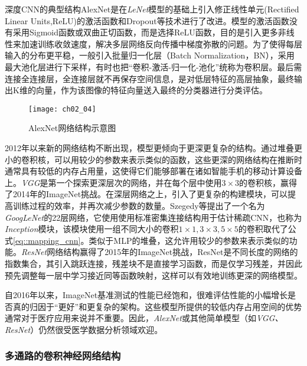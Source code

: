 深度CNN的典型结构AlexNet\cite{Krizhevsky2012}是在{\it LeNet}模型\citep{Jarrett2009}的基础上引入修正线性单元(Rectified Linear Units,ReLU)的激活函数和Dropout等技术\citep{Krizhevsky2012}进行了改进。模型的激活函数没有采用Sigmoid函数或双曲正切函数，而是选择ReLU函数，目的是引入更多非线性来加速训练收敛速度，解决多层网络反向传播中梯度弥散的问题。为了使得每层输入的分布更平稳，一般引入批量归一化层（Batch Normalization，BN）\cite{Ioffe2014Batch}，采用最大池化层进行下采样，有时也把“卷积-激活-归一化-池化”统称为卷积层。最后需连接全连接层，全连接层就不再保存空间信息，是对低层特征的高层抽象，最终输出K维的向量，作为该图像的特征向量送入最终的分类器进行分类评估。
\begin{figure}[!htbp]
    \centering
    \texttt{[image: ch02\_04]}
    \caption{AlexNet网络结构示意图~\cite{Krizhevsky2012}}
    \label{fig:ch02_04}
\end{figure}
 
2012年以来新的网络结构不断出现，模型更倾向于更深更复杂的结构。通过堆叠更小的卷积核，可以用较少的参数来表示类似的函数，这些更深的网络结构在推断时通常具有较低的内存占用量，这使得它们能够部署在诸如智能手机的移动计算设备上。{\it VGG}\citep{Simonyan2014a}是第一个探索更深层次的网络，并在每个层中使用$3 \times 3$的卷积核，赢得了2014年的ImageNet挑战。在深层网络之上，引入了更复杂的构建模块，可以提高训练过程的效率，并再次减少参数的数量。Szegedy等\cite{Szegedy2015}提出了一个名为{\it GoogLeNet}的22层网络，它使用使用标准密集连接结构用于估计稀疏CNN，也称为{\it Inception}模块\citep{Lin2013a}，该模块使用一组不同大小的卷积$1 \times 1,3 \times 3,5 \times 5$的卷积取代了公式\eqref{eq::mapping_cnn}。类似于MLP的堆叠，这允许用较少的参数来表示类似的功能。{\it ResNet}网络结构\citep{he15}赢得了2015年的ImageNet挑战，ResNet是不同长度的网络的指数集合，其引入跳跃连接，残差块不是直接学习函数，而是仅学习残差，并因此预先调整每一层中学习接近同等函数映射，这样可以有效地训练更深的网络模型。

自2016年以来，ImageNet基准测试的性能已经饱和，很难评估性能的小幅增长是否真的归因于“更好”和更复杂的架构。这些模型所提供的较低内存占用空间的优势通常对于医疗应用来说并不重要。因此，{\it AlexNet}或其他简单模型（如{\it VGG、ResNet}）仍然很受医学数据分析领域欢迎。

\subsubsection{多通路的卷积神经网络结构}
\label{sec:mc_architectures}

